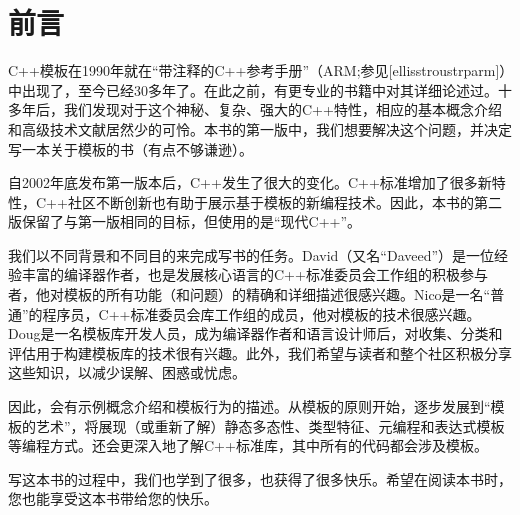 \chapter{前言}

C++模板在1990年就在“带注释的C++参考手册”（ARM;参见[ellisstroustrparm]）中出现了，至今已经30多年了。在此之前，有更专业的书籍中对其详细论述过。十多年后，我们发现对于这个神秘、复杂、强大的C++特性，相应的基本概念介绍和高级技术文献居然少的可怜。本书的第一版中，我们想要解决这个问题，并决定写一本关于模板的书（有点不够谦逊）。

自2002年底发布第一版本后，C++发生了很大的变化。C++标准增加了很多新特性，C++社区不断创新也有助于展示基于模板的新编程技术。因此，本书的第二版保留了与第一版相同的目标，但使用的是“现代C++”。

我们以不同背景和不同目的来完成写书的任务。David（又名“Daveed”）是一位经验丰富的编译器作者，也是发展核心语言的C++标准委员会工作组的积极参与者，他对模板的所有功能（和问题）的精确和详细描述很感兴趣。Nico是一名“普通”的程序员，C++标准委员会库工作组的成员，他对模板的技术很感兴趣。Doug是一名模板库开发人员，成为编译器作者和语言设计师后，对收集、分类和评估用于构建模板库的技术很有兴趣。此外，我们希望与读者和整个社区积极分享这些知识，以减少误解、困惑或忧虑。

因此，会有示例概念介绍和模板行为的描述。从模板的原则开始，逐步发展到“模板的艺术”，将展现（或重新了解）静态多态性、类型特征、元编程和表达式模板等编程方式。还会更深入地了解C++标准库，其中所有的代码都会涉及模板。

写这本书的过程中，我们也学到了很多，也获得了很多快乐。希望在阅读本书时，您也能享受这本书带给您的快乐。